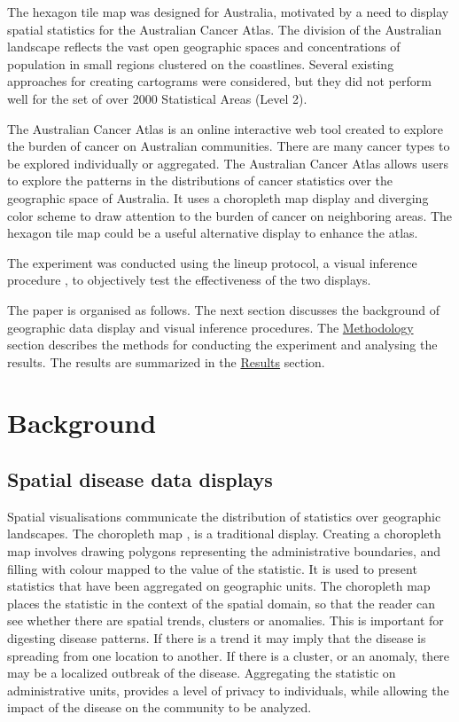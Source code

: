 \documentclass{monashthesis}
\begin{document}
The hexagon tile map was designed for Australia, motivated by a need to display spatial statistics for the Australian Cancer Atlas. The division of the Australian landscape reflects the vast open geographic spaces and concentrations of population in small regions clustered on the coastlines. Several existing approaches for creating cartograms were considered, but they did not perform well for the set of over 2000 Statistical Areas (Level 2).

The Australian Cancer Atlas \autocite{TACA} is an online interactive web tool created to explore the burden of cancer on Australian communities. There are many cancer types to be explored individually or aggregated. The Australian Cancer Atlas allows users to explore the patterns in the distributions of cancer statistics over the geographic space of Australia. It uses a choropleth map display and diverging color scheme to draw attention to the burden of cancer on neighboring areas. The hexagon tile map could be a useful alternative display to enhance the atlas.

The experiment was conducted using the lineup protocol, a visual inference procedure \autocite{GIIV}, to objectively test the effectiveness of the two displays.

The paper is organised as follows. The next section discusses the background of geographic data display and visual inference procedures. The \protect\hyperlink{methodology}{Methodology} section describes the methods for conducting the experiment and analysing the results. The results are summarized in the \protect\hyperlink{results}{Results} section.

\hypertarget{background}{%
\section{Background}\label{background}}

\hypertarget{spatial-disease-data-displays}{%
\subsection{Spatial disease data displays}\label{spatial-disease-data-displays}}

Spatial visualisations communicate the distribution of statistics over geographic landscapes. The choropleth map \autocite{EI}, \autocite{BCM} is a traditional display. Creating a choropleth map involves drawing polygons representing the administrative boundaries, and filling with colour mapped to the value of the statistic. It is used to present statistics that have been aggregated on geographic units. The choropleth map places the statistic in the context of the spatial domain, so that the reader can see whether there are spatial trends, clusters or anomalies. This is important for digesting disease patterns. If there is a trend it may imply that the disease is spreading from one location to another. If there is a cluster, or an anomaly, there may be a localized outbreak of the disease. Aggregating the statistic on administrative units, provides a level of privacy to individuals, while allowing the impact of the disease on the community to be analyzed.
\end{document}
